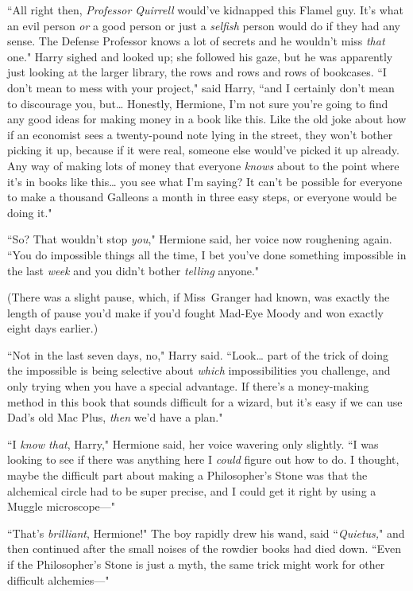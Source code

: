 ``All right then, \emph{Professor Quirrell} would've kidnapped this Flamel guy. It's what an evil person \emph{or} a good person or just a \emph{selfish} person would do if they had any sense. The Defense Professor knows a lot of secrets and he wouldn't miss \emph{that} one." Harry sighed and looked up; she followed his gaze, but he was apparently just looking at the larger library, the rows and rows and rows of bookcases. ``I don't mean to mess with your project," said Harry, ``and I certainly don't mean to discourage you, but{\ldots} Honestly, Hermione, I'm not sure you're going to find any good ideas for making money in a book like this. Like the old joke about how if an economist sees a twenty-pound note lying in the street, they won't bother picking it up, because if it were real, someone else would've picked it up already. Any way of making lots of money that everyone \emph{knows} about to the point where it's in books like this{\ldots} you see what I'm saying? It can't be possible for everyone to make a thousand Galleons a month in three easy steps, or everyone would be doing it."

``So? That wouldn't stop \emph{you}," Hermione said, her voice now roughening again. ``You do impossible things all the time, I bet you've done something impossible in the last \emph{week} and you didn't bother \emph{telling} anyone."

(There was a slight pause, which, if Miss~Granger had known, was exactly the length of pause you'd make if you'd fought Mad-Eye Moody and won exactly eight days earlier.)

``Not in the last seven days, no," Harry said. ``Look{\ldots} part of the trick of doing the impossible is being selective about \emph{which} impossibilities you challenge, and only trying when you have a special advantage. If there's a money-making method in this book that sounds difficult for a wizard, but it's easy if we can use Dad's old Mac Plus, \emph{then} we'd have a plan."

``I \emph{know that}, Harry," Hermione said, her voice wavering only slightly. ``I was looking to see if there was anything here I \emph{could} figure out how to do. I thought, maybe the difficult part about making a Philosopher's Stone was that the alchemical circle had to be super precise, and I could get it right by using a Muggle microscope—"

``That's \emph{brilliant}, Hermione!" The boy rapidly drew his wand, said ``\emph{Quietus,}" and then continued after the small noises of the rowdier books had died down. ``Even if the Philosopher's Stone is just a myth, the same trick might work for other difficult alchemies—"

